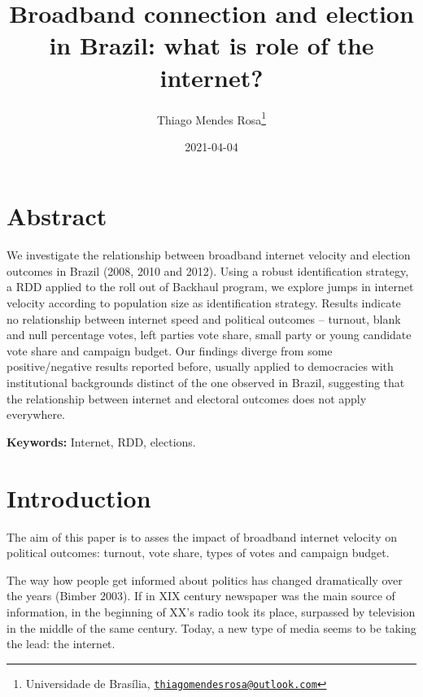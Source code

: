 \documentclass[
  12pt,
]{article}
\title{Broadband connection and election in Brazil: what is role of the
internet?}
\author{Thiago Mendes Rosa\footnote{Universidade de Brasília,
  \href{mailto:thiagomendesrosa@outlook.com}{\nolinkurl{thiagomendesrosa@outlook.com}}}}
\date{2021-04-04}
\begin{document}
\maketitle

\let\oldthebibliography\thebibliography
\let\endoldthebibliography\endthebibliography
\renewenvironment{thebibliography}[1]{
  \begin{oldthebibliography}{#1}
    \setlength{\itemsep}{0em}
    \setlength{\parskip}{0em}
}
{
  \end{oldthebibliography}
}

\allsectionsfont{\centering}

\hypertarget{abstract}{%
\section*{Abstract}\label{abstract}}

We investigate the relationship between broadband internet velocity and
election outcomes in Brazil (2008, 2010 and 2012). Using a robust
identification strategy, a RDD applied to the roll out of Backhaul
program, we explore jumps in internet velocity according to population
size as identification strategy. Results indicate no relationship
between internet speed and political outcomes -- turnout, blank and null
percentage votes, left parties vote share, small party or young
candidate vote share and campaign budget. Our findings diverge from some
positive/negative results reported before, usually applied to
democracies with institutional backgrounds distinct of the one observed
in Brazil, suggesting that the relationship between internet and
electoral outcomes does not apply everywhere.

\textbf{Keywords:} Internet, RDD, elections.

\allsectionsfont{\raggedright}

\clearpage

\hypertarget{introduction}{%
\section*{Introduction}\label{introduction}}

The aim of this paper is to asses the impact of broadband internet
velocity on political outcomes: turnout, vote share, types of votes and
campaign budget.

The way how people get informed about politics has changed dramatically
over the years (Bimber 2003). If in XIX century newspaper was the main
source of information, in the beginning of XX's radio took its place,
surpassed by television in the middle of the same century. Today, a new
type of media seems to be taking the lead: the internet.
\end{document}
